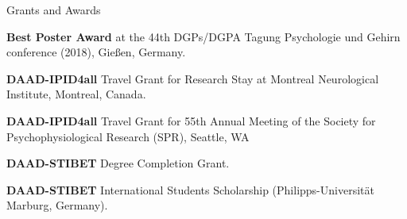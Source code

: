 \begin{rubric}{Grants and Awards}


\entry*[2018:] 
\textbf{Best Poster Award} at the 44th DGPs/DGPA Tagung Psychologie und Gehirn conference (2018),
Gie{\ss}en, Germany.

\entry*[2016:] 
\textbf{DAAD-IPID4all} Travel Grant for Research Stay at Montreal Neurological Institute, Montreal, Canada.

\entry*[2015:] 
\textbf{DAAD-IPID4all} Travel Grant for 55th Annual Meeting of the Society for Psychophysiological Research (SPR), Seattle, WA

\entry*[2013:] 
\textbf{DAAD-STIBET} Degree Completion Grant.

\entry*[2011:] 
\textbf{DAAD-STIBET} International Students Scholarship (Philipps-Universit\"at Marburg, Germany).

\end{rubric}
